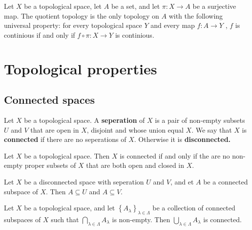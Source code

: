 \documentclass{article}
\theoremstyle{remark}
\begin{document}
\begin{theorem}
    Let $X$ be a topological space, let $A$  be a set, and let $\pi : X \to A$ be a surjective map. The quotient
    topology is the only topology on $A$ with the following universal property: for every topological space $Y$ and
    every map $f: A \to Y$ , $f $ is continious if and only if $f \circ \pi : X \to Y$ is continious.
\end{theorem}






\section{ Topological properties}%
\label{sec:chapter_6_topological_properties}

\subsection{Connected spaces}%
\label{sub:connected_spaces}


\begin{definition}
Let $X$ be a topological space. A \textbf{seperation} of $X$ is a pair of non-empty subsets $U $ and $V$ that are open
in $X$, disjoint and whose union equal $X$. We say that $X$ is \textbf{connected} if there are no seperations of $X$.
Otherwise it is \textbf{disconnected.}
\end{definition}

\begin{theorem}
    Let $X$ be a topological space. Then $X$ is connected if and only if the are no non-empty proper subsets of $X$ that
    are both open and closed in $X$.

\end{theorem}

\begin{lemma}[Disconnectivity]
    Let $X$ be a disconnected space with seperation $U$ and $V$,  and et $A$ be a connected subspace of $X$. Then $A
    \subseteq U$ and $A \subseteq  V$.

\end{lemma}

\begin{theorem}
    Let $X$ be a topological space,  and let $\left\{ A_{\lambda } \right\}_{\lambda \in \Lambda }$ be a collection of
    connected subspaces of $X$ such that $ \bigcap_{\lambda  \in \Lambda } A_{\lambda }$ is non-empty. Then $\bigcup
    _{\lambda \in  \Lambda } A_{\lambda }$ is connected.

\end{theorem}
\end{document}
